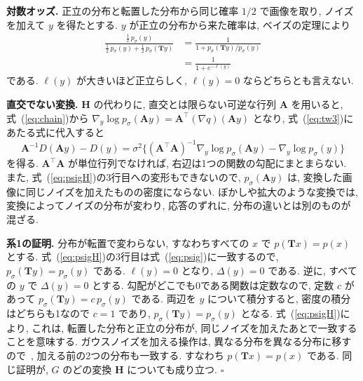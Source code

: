 \documentclass[MIRU,submit]{miru2025j}
\newcommand{\Tm}{\mathbf{T}}            %
\newcommand{\Hm}{\mathbf{H}}            %
\renewcommand{\eqref}[1]{(\ref{#1})}
\begin{document}
\textbf{対数オッズ.} 正立の分布と転置した分布から同じ確率 $1/2$ で画像を取り, ノイズを加えて $y$ を得たとする. $y$ が正立の分布から来た確率は, ベイズの定理により
\begin{equation}
\begin{split}
\frac{\frac{1}{2}\,p_\sigma(y)}{\frac{1}{2}\,p_\sigma(y)+\frac{1}{2}\,p_\sigma(\Tm y)}&=\frac{1}{1+p_\sigma(\Tm y)/p_\sigma(y)}\\
&=\frac{1}{1+e^{-\ell(y)}}
\end{split}
\label{eq:odds}
\end{equation}
である. $\ell(y)$ が大きいほど正立らしく, $\ell(y)=0$ ならどちらとも言えない.

\textbf{直交でない変換.} $\Hm$ の代わりに, 直交とは限らない可逆な行列 $\mathbf{A}$ を用いると, 式~\eqref{eq:chain}から $\nabla_y\log p_\sigma(\mathbf{A}y)=\mathbf{A}^{\top}(\nabla q)(\mathbf{A}y)$ となり, 式~\eqref{eq:tw3}にあたる式に代入すると
\begin{equation}
\mathbf{A}^{-1}D(\mathbf{A}y)-D(y)=\sigma^{2}\bigl\{(\mathbf{A}^{\top}\mathbf{A})^{-1}\nabla_y\log p_\sigma(\mathbf{A}y)-\nabla_y\log p_\sigma(y)\bigr\}
\label{eq:nonorth}
\end{equation}
を得る. $\mathbf{A}^{\top}\mathbf{A}$ が単位行列でなければ, 右辺は1つの関数の勾配にまとまらない. また, 式~\eqref{eq:psigH}の3行目への変形もできないので, $p_\sigma(\mathbf{A}y)$ は, 変換した画像に同じノイズを加えたものの密度にならない. ぼかしや拡大のような変換では, 変換によってノイズの分布が変わり, 応答のずれに, 分布の違いとは別のものが混ざる.

\textbf{系1の証明.} 分布が転置で変わらない, すなわちすべての $x$ で $p(\Tm x)=p(x)$ とする. 式~\eqref{eq:psigH}の3行目は式~\eqref{eq:psig}に一致するので, $p_\sigma(\Tm y)=p_\sigma(y)$ である. $\ell(y)=0$ となり, $\Delta(y)=0$ である. 逆に, すべての $y$ で $\Delta(y)=0$ とする. 勾配がどこでも0である関数は定数なので, 定数 $c$ があって $p_\sigma(\Tm y)=c\,p_\sigma(y)$ である. 両辺を $y$ について積分すると, 密度の積分はどちらも1なので $c=1$ であり, $p_\sigma(\Tm y)=p_\sigma(y)$ となる. 式~\eqref{eq:psigH}により, これは, 転置した分布と正立の分布が, 同じノイズを加えたあとで一致することを意味する. ガウスノイズを加える操作は, 異なる分布を異なる分布に移すので~\cite{lu2025group}, 加える前の2つの分布も一致する. すなわち $p(\Tm x)=p(x)$ である. 同じ証明が, $G$ のどの変換 $\Hm$ についても成り立つ. \hfill$\square$
\end{document}
